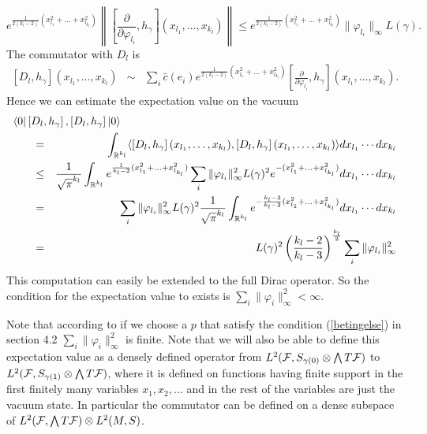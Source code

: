 \documentclass[letterpaper,11pt]{article}
\newcommand{\nn}{\nonumber}
\def\cf{{\cal F}}
\newcommand{\cF}{{\cal F}}
\newcommand{\R}{\mathbb{ R}}
\begin{document}
$$ e^{\frac{1}{2(k_l-2)}(x_{l_1}^2+\ldots +x_{l_{k_l}}^2)} \left\| \left[ \frac{\partial}{ \partial \varphi_{l_i}} , h_\gamma \right]  (x_{l_1}, \ldots , x_{k_{l}}) \right\|  \leq e^{\frac{1}{2(k_l-2)}(x_{l_1}^2+\ldots +x_{l_{k_l}}^2)} \| \varphi_{l_i}\|_\infty L(\gamma )  . $$ 
The commutator with $D_l$ is
\begin{eqnarray*} 
\left[ D_l , h_\gamma \right] ( x_{l_1}, \ldots , x_{k_{l}} ) &\sim & \sum_i \bar{c} (e_i) 
e^{\frac{1}{2(k_l-2)}(x_{l_1}^2+\ldots +x_{l_{k_l}}^2)}  \left[ \frac{\partial}{ \partial \varphi_{l_i}} , h_\gamma \right] (x_{l_1}, \ldots , x_{k_{l}}) . 
\end{eqnarray*}
 Hence we can estimate the expectation value on the vacuum
\begin{eqnarray*}
\langle 0| \left[ D_l , h_\gamma \right] ,\left[ D_l , h_\gamma \right] |0     \rangle  \hspace{-2,8cm}&&
\nn\\
&=& \int_{\R^{k_l}} \langle \left[ D_l , h_\gamma \right] ( x_{l_1}, \ldots , x_{k_{l}} )   , \left[ D_l , h_\gamma \right] ( x_{l_1}, \ldots , x_{k_{l}} ) \rangle  dx_{l_1} \cdots dx_{k_l} \\
&\leq &\frac{1}{\sqrt{\pi}^{k_l}} \int_{\R^{k_l}}  e^{\frac{1}{k_l-2}(x_{l_1}^2+\ldots +x_{l_{k_l}}^2)} \sum_i \| \varphi_{l_i}\|_\infty^2 L(\gamma)^2  e^{-(x_{l_1}^2+\ldots +x_{l_{k_l}}^2)}  dx_{l_1} \cdots dx_{k_l}\\
&=&  \sum_i \| \varphi_{l_i}\|_\infty^2 L(\gamma)^2 \frac{1}{\sqrt{\pi}^{k_l}}  \int_{\R^{k_l}}   e^{-\frac{k_l-3}{k_l-2}(x_{l_1}^2+\ldots +x_{l_{k_l}}^2)}  dx_{l_1} \cdots dx_{k_l}\\  
&=& L(\gamma)^2 \left( \frac{k_l-2}{k_l-3}\right)^{\frac{k_l}{2}} \sum_i \| \varphi_{l_i}\|_\infty^2   
\end{eqnarray*}
This computation can easily be extended to the full Dirac operator. So the condition for the expectation value to exists is $\sum_i \| \varphi_{i}\|_\infty^2<\infty$. 


Note that according to \cite{Aastrup:2017vrm} if we choose a $p$ that satisfy the condition (\ref{betingelse}) in section 4.2   $\sum_i \| \varphi_{i}\|_\infty^2$ is finite. Note that we will also be able to define this expectation value as a densely defined operator from  $L^2(\cF,S_{\gamma (0)} \otimes \bigwedge T\cf )$ to $L^2(\cF,S_{\gamma (1)} \otimes \bigwedge T\cf )$, where it is defined on functions having finite support in the first finitely many variables $x_1,x_2,\ldots$ and in the rest of the variables are just the vacuum state. In particular the commutator can be defined on a dense subspace of $L^2(\cF,  \bigwedge T\cf ) \otimes L^2(M,S)$.  
\end{document}
